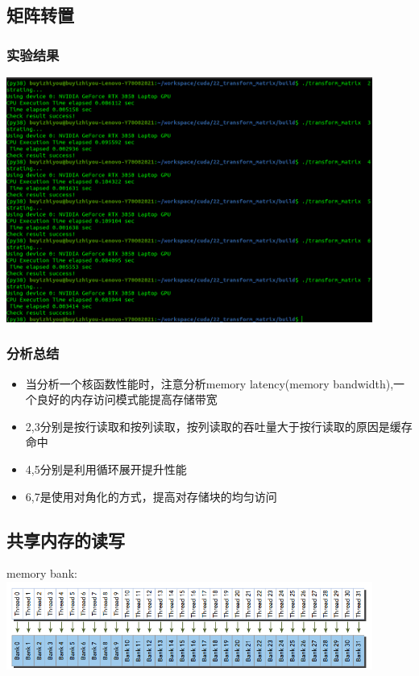 \subsection{矩阵转置}
\subsubsection{实验结果}
\noindent
\includegraphics[width=0.9\textwidth]{assets/diag.png}
\subsubsection{分析总结}
\noindent
\begin{itemize}
	\item 当分析一个核函数性能时，注意分析memory latency(memory bandwidth),一个良好的内存访问模式能提高存储带宽
	\item 2,3分别是按行读取和按列读取，按列读取的吞吐量大于按行读取的原因是缓存命中
	\item 4,5分别是利用循环展开提升性能
	\item 6,7是使用对角化的方式，提高对存储块的均匀访问
\end{itemize}


\subsection{共享内存的读写}
memory bank:\\
\includegraphics[width=0.9\textwidth]{assets/bank.png}\\

